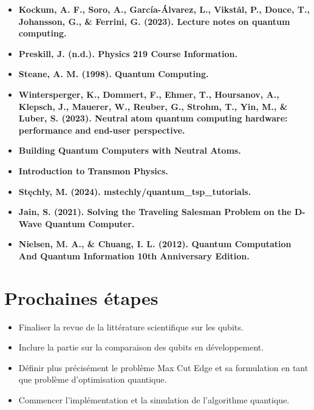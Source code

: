\documentclass[12pt]{article}
\begin{document}
\begin{itemize}
    \item \textbf{Kockum, A. F., Soro, A., García-Álvarez, L., Vikstål, P., Douce, T., Johansson, G., \& Ferrini, G. (2023). Lecture notes on quantum computing.} 
    \item \textbf{Preskill, J. (n.d.). Physics 219 Course Information.} 
    \item \textbf{Steane, A. M. (1998). Quantum Computing.}
    \item \textbf{Wintersperger, K., Dommert, F., Ehmer, T., Hoursanov, A., Klepsch, J., Mauerer, W., Reuber, G., Strohm, T., Yin, M., \& Luber, S. (2023). Neutral atom quantum computing hardware: performance and end-user perspective.} \cite{wintersperger_neutral_2023}
    \item \textbf{Building Quantum Computers with Neutral Atoms.} 
    \item \textbf{Introduction to Transmon Physics.}
    \item \textbf{Stęchły, M. (2024). mstechly/quantum\_tsp\_tutorials.} 
    \item \textbf{Jain, S. (2021). Solving the Traveling Salesman Problem on the D-Wave Quantum Computer.}
    \item \textbf{Nielsen, M. A., \& Chuang, I. L. (2012). Quantum Computation And Quantum Information 10th Anniversary Edition.} 
\end{itemize}

\section*{Prochaines étapes}

\begin{itemize}
    \item Finaliser la revue de la littérature scientifique sur les qubits.
    \item Inclure la partie sur la comparaison des qubits en développement.
    \item Définir plus précisément le problème Max Cut Edge et sa formulation en tant que problème d'optimisation quantique.
    \item Commencer l'implémentation et la simulation de l'algorithme quantique.
\end{itemize}
\end{document}
